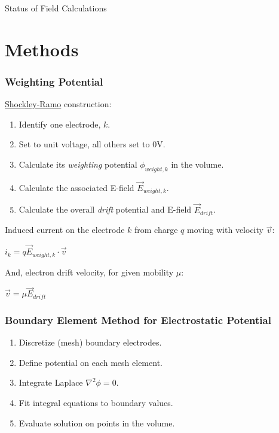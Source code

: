 \documentclass[xcolor=dvipsnames]{beamer}
\date{\today}
\begin{document}
\begin{frame}{Status of Field Calculations}
  \tableofcontents
\end{frame}

\section{Methods}

\begin{frame}[fragile]
  \frametitle{Weighting Potential}
  \href{https://en.wikipedia.org/wiki/Shockley%E2%80%93Ramo_theorem}{Shockley-Ramo} construction:
  \begin{enumerate}
  \item Identify one electrode, $k$.
  \item Set to unit voltage, all others set to 0V.
  \item Calculate its \textit{weighting} potential $\phi_{weight,k}$ in the volume.
  \item Calculate the associated E-field $\vec{E}_{weight,k}$.
  \item Calculate the overall \textit{drift} potential and E-field
    $\vec{E}_{drift}$.
  \end{enumerate}
  Induced current on the electrode $k$ from charge $q$ moving with velocity $\vec{v}$:
  \begin{center}
    $i_k = q \vec{E}_{weight,k} \cdot \vec{v}$
  \end{center}
  And, electron drift velocity, for given mobility $\mu$:
  \begin{center}
    $\vec{v} = \mu \vec{E}_{drift}$
  \end{center}

\end{frame}

\begin{frame}
  \frametitle{Boundary Element Method for Electrostatic Potential}

  \begin{enumerate}
  \item Discretize (mesh) boundary electrodes.
  \item Define potential on each mesh element.
  \item Integrate Laplace $\nabla^2\phi=0$.
  \item Fit integral equations to boundary values.
  \item Evaluate solution on points in the volume.
  \end{enumerate}

\end{frame}
\end{document}
